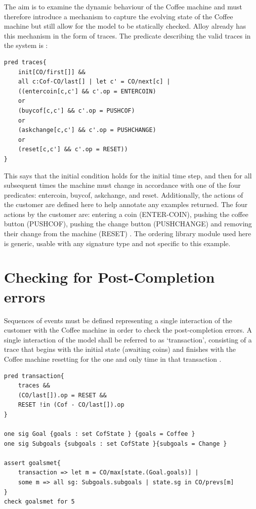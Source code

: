 \documentclass[a4paper,10pt]{report}
\begin{document}
The aim is to examine the dynamic behaviour of the Coffee machine and must therefore introduce a mechanism to capture the evolving state of the Coffee machine but still allow for the model to be statically checked. Alloy already has this mechanism in the form of traces. The predicate describing the valid traces in the system is \cite{Boyatt}:

\begin{verbatim}
pred traces{
	init[CO/first[]] &&
	all c:Cof-CO/last[] | let c' = CO/next[c] |
	((entercoin[c,c'] && c'.op = ENTERCOIN)
	or
	(buycof[c,c'] && c'.op = PUSHCOF)
	or
	(askchange[c,c'] && c'.op = PUSHCHANGE)
	or
	(reset[c,c'] && c'.op = RESET))
}
\end{verbatim}

This says that the initial condition holds for the initial time step, and then for all subsequent times the machine must change in accordance with one of the four predicates: entercoin, buycof, askchange, and reset. Additionally, the actions of the customer are defined here to help annotate any examples returned. The four actions by the customer are: entering a coin (ENTER-COIN), pushing the coffee button (PUSHCOF), pushing the change button (PUSHCHANGE) and removing their change from the machine (RESET) \cite{Boyatt}. The ordering library module used here is generic, usable with any signature type and not specific to this example.

\section{Checking for Post-Completion errors}
\label{Post completion error check}

Sequences of events must be defined representing a single interaction of the customer with the Coffee machine in order to check the post-completion errors. A single interaction of the model shall be referred to as `transaction’, consisting of a trace that begins with the initial state (awaiting coins) and finishes with the Coffee machine resetting for the one and only time in that transaction \cite{Boyatt}.

\begin{verbatim}
pred transaction{
	traces &&
	(CO/last[]).op = RESET &&
	RESET !in (Cof - CO/last[]).op
}

one sig Goal {goals : set CofState } {goals = Coffee }
one sig Subgoals {subgoals : set CofState }{subgoals = Change }

assert goalsmet{
	transaction => let m = CO/max[state.(Goal.goals)] |
	some m => all sg: Subgoals.subgoals | state.sg in CO/prevs[m]
}
check goalsmet for 5
\end{verbatim}
\end{document}
